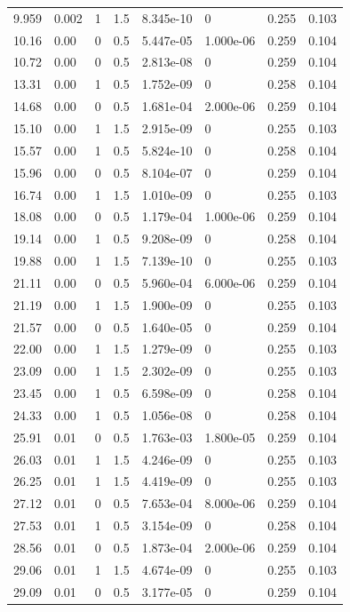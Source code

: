\documentclass[preview]{standalone}
\begin{document}
{{\begin{tabular}{L{1.2cm}C{1.2cm} C{0.3cm}C{0.5cm} C{1.4cm}C{1.4cm} C{1.4cm}C{1.4cm}}
  9.959  &  0.002  & 1     & 1.5 &  8.345e-10  & 0  & 0.255 &  0.103   \\ 
  10.16  &  0.00  & 0     & 0.5 &  5.447e-05  & 1.000e-06  & 0.259 &  0.104   \\ 
  10.72  &  0.00  & 0     & 0.5 &  2.813e-08  & 0  & 0.259 &  0.104   \\ 
  13.31  &  0.00  & 1     & 0.5 &  1.752e-09  & 0  & 0.258 &  0.104   \\ 
  14.68  &  0.00  & 0     & 0.5 &  1.681e-04  & 2.000e-06  & 0.259 &  0.104   \\ 
  15.10  &  0.00  & 1     & 1.5 &  2.915e-09  & 0  & 0.255 &  0.103   \\ 
  15.57  &  0.00  & 1     & 0.5 &  5.824e-10  & 0  & 0.258 &  0.104   \\ 
  15.96  &  0.00  & 0     & 0.5 &  8.104e-07  & 0  & 0.259 &  0.104   \\ 
  16.74  &  0.00  & 1     & 1.5 &  1.010e-09  & 0  & 0.255 &  0.103   \\ 
  18.08  &  0.00  & 0     & 0.5 &  1.179e-04  & 1.000e-06  & 0.259 &  0.104   \\ 
  19.14  &  0.00  & 1     & 0.5 &  9.208e-09  & 0  & 0.258 &  0.104   \\ 
  19.88  &  0.00  & 1     & 1.5 &  7.139e-10  & 0  & 0.255 &  0.103   \\ 
  21.11  &  0.00  & 0     & 0.5 &  5.960e-04  & 6.000e-06  & 0.259 &  0.104   \\ 
  21.19  &  0.00  & 1     & 1.5 &  1.900e-09  & 0  & 0.255 &  0.103   \\ 
  21.57  &  0.00  & 0     & 0.5 &  1.640e-05  & 0  & 0.259 &  0.104   \\ 
  22.00  &  0.00  & 1     & 1.5 &  1.279e-09  & 0  & 0.255 &  0.103   \\ 
  23.09  &  0.00  & 1     & 1.5 &  2.302e-09  & 0  & 0.255 &  0.103   \\ 
  23.45  &  0.00  & 1     & 0.5 &  6.598e-09  & 0  & 0.258 &  0.104   \\ 
  24.33  &  0.00  & 1     & 0.5 &  1.056e-08  & 0  & 0.258 &  0.104   \\ 
  25.91  &  0.01  & 0     & 0.5 &  1.763e-03  & 1.800e-05  & 0.259 &  0.104   \\ 
  26.03  &  0.01  & 1     & 1.5 &  4.246e-09  & 0  & 0.255 &  0.103   \\ 
  26.25  &  0.01  & 1     & 1.5 &  4.419e-09  & 0  & 0.255 &  0.103   \\ 
  27.12  &  0.01  & 0     & 0.5 &  7.653e-04  & 8.000e-06  & 0.259 &  0.104   \\ 
  27.53  &  0.01  & 1     & 0.5 &  3.154e-09  & 0  & 0.258 &  0.104   \\ 
  28.56  &  0.01  & 0     & 0.5 &  1.873e-04  & 2.000e-06  & 0.259 &  0.104   \\ 
  29.06  &  0.01  & 1     & 1.5 &  4.674e-09  & 0  & 0.255 &  0.103   \\ 
  29.09  &  0.01  & 0     & 0.5 &  3.177e-05  & 0  & 0.259 &  0.104   \\ 
\hline 
\end{tabular} 

}}
\end{document}
